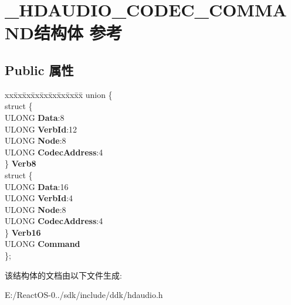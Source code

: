 \hypertarget{struct___h_d_a_u_d_i_o___c_o_d_e_c___c_o_m_m_a_n_d}{}\section{\+\_\+\+H\+D\+A\+U\+D\+I\+O\+\_\+\+C\+O\+D\+E\+C\+\_\+\+C\+O\+M\+M\+A\+N\+D结构体 参考}
\label{struct___h_d_a_u_d_i_o___c_o_d_e_c___c_o_m_m_a_n_d}
\subsection*{Public 属性}
\begin{DoxyCompactItemize}
\item 
\mbox{\label{struct___h_d_a_u_d_i_o___c_o_d_e_c___c_o_m_m_a_n_d_a3d23dc2ffd3a3d3e3af018615afb5f0f}} 
\begin{tabbing}
xx\=xx\=xx\=xx\=xx\=xx\=xx\=xx\=xx\=\kill
union \{\\
\>struct \{\\
\>\>ULONG {\bfseries Data}:8\\
\>\>ULONG {\bfseries VerbId}:12\\
\>\>ULONG {\bfseries Node}:8\\
\>\>ULONG {\bfseries CodecAddress}:4\\
\>\} {\bfseries Verb8}\\
\>struct \{\\
\>\>ULONG {\bfseries Data}:16\\
\>\>ULONG {\bfseries VerbId}:4\\
\>\>ULONG {\bfseries Node}:8\\
\>\>ULONG {\bfseries CodecAddress}:4\\
\>\} {\bfseries Verb16}\\
\>ULONG {\bfseries Command}\\
\}; \\

\end{tabbing}\end{DoxyCompactItemize}


该结构体的文档由以下文件生成\+:\begin{DoxyCompactItemize}
\item 
E\+:/\+React\+O\+S-\/0../sdk/include/ddk/hdaudio.\+h\end{DoxyCompactItemize}
